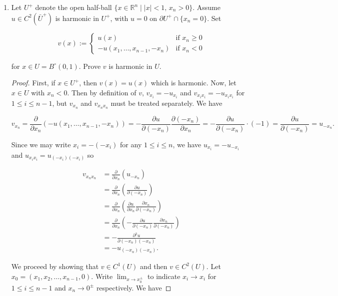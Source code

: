 \documentclass[11pt,oneside,english]{amsart}
\theoremstyle{definition}
\newcommand{\lom}[2]{\lim_{{#1}\rightarrow{#2}}}
\newcommand{\R}{\mathbb{R}}
\newcommand{\pp}[2]{\frac{\partial{#1}}{\partial{#2}}}
\begin{document}
\begin{enumerate}
\begin{proof}
\[
r^{n-2}\frac{r-|x|}{(r+|x|)^{n-1}}u(0)\leq u(x)\leq r^{n-2}\frac{r+|x|}{(r-|x|)^{n-1}}u(0).
\]
\end{proof}



\vfill
\pagebreak

\setcounter{enumi}{8}

\item Let $U^+$ denote the open half-ball $\{x\in\R^n\mid |x|<1,\, x_n>0\}$. Assume $u\in C^2(\bar{U}^+)$ is harmonic in $U^+$, with $u=0$ on $\partial U^+\cap\{x_n=0\}$. Set 

\[
v(x):=\begin{cases} u(x) & \text{if } x_n\geq0\\ -u(x_1,\ldots,x_{n-1},-x_n) & \text{if } x_n<0\end{cases}
\]

for $x\in U=B^\circ(0,1)$. Prove $v$ is harmonic in $U$.


\begin{proof}
First, if $x\in U^+$, then $v(x)=u(x)$ which is harmonic. Now, let $x\in U$ with $x_n<0$. Then by definition of $v$, $v_{x_i}=-u_{x_i}$ and $v_{x_ix_i}=-u_{x_ix_i}$ for $1\leq i\leq n-1$, but $v_{x_n}$ and $v_{x_nx_n}$ must be treated separately. We have

\[
v_{x_n}=\pp{}{x_n}(-u(x_1,\ldots,x_{n-1},-x_n))=-\pp{u}{(-x_n)}\pp{(-x_n)}{x_n}=-\pp{u}{(-x_n)}\cdot(-1)=\pp{u}{(-x_n)}=u_{-x_n}.
\]

Since we may write $x_i=-(-x_i)$ for any $1\leq i\leq n$, we have $u_{x_i}=-u_{-x_i}$ and $u_{x_ix_i}=u_{(-x_i)(-x_i)}$ so


\begin{align*}
v_{x_nx_n}&=\pp{}{x_n}(u_{-x_n})\\[2mm]
&=\pp{}{x_n}\left(\pp{u}{(-x_n)}\right)\\[2mm]
&=\pp{}{x_n}\left(\pp{u}{x_n}\pp{x_n}{(-x_n)}\right)\\[2mm]
&=\pp{}{x_n}\left(-\pp{u}{(-x_n)}\pp{x_n}{(-x_n)}\right)\\[2mm]
&=-\pp{^2u}{(-x_n)(-x_n)}\\[2mm]
&=-u_{(-x_n)(-x_n)}.
\end{align*}

We proceed by showing that $v\in C^1(U)$ and then $v\in C^2(U)$. Let $x_0=(x_1,x_2,\ldots,x_{n-1},0)$. Write $\lom{x}{x_0^\pm}$ to indicate $x_i\rightarrow x_i$ for $1\leq i\leq n-1$ and  $x_n\rightarrow 0^\pm$ respectively. We have



\end{proof}
\end{enumerate}
\end{document}
